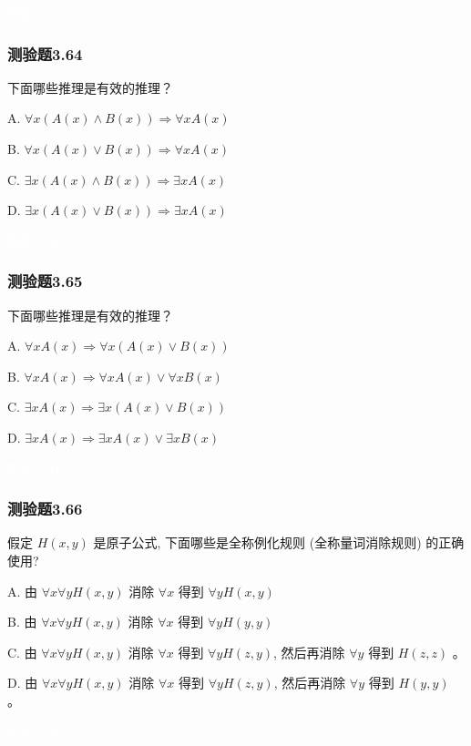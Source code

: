 \documentclass[UTF8, heading=true]{ctexart}
\begin{document}
\textcolor{white}{答案：BC}

\subsubsection{测验题3.64}

下面哪些推理是有效的推理？

A. $\forall x(A(x) \wedge B(x)) \Longrightarrow \forall x A(x)$

B. $\forall x(A(x) \vee B(x)) \Longrightarrow \forall x A(x)$

C. $\exists x(A(x) \wedge B(x)) \Longrightarrow \exists x A(x)$

D. $\exists x(A(x) \vee B(x)) \Longrightarrow \exists x A(x)$

\textcolor{white}{答案：AC}

\subsubsection{测验题3.65}

下面哪些推理是有效的推理？

A. $
\forall x A(x) \Longrightarrow \forall x(A(x) \vee B(x))
$

B. $
\forall x A(x) \Longrightarrow \forall x A(x) \vee \forall x B(x)
$

C. $
\exists x A(x) \Longrightarrow \exists x(A(x) \vee B(x))
$

D. $
\exists x A(x) \Longrightarrow \exists x A(x) \vee \exists x B(x)
$

\textcolor{white}{答案：ABCD}


\subsubsection{测验题3.66}

假定 $H(x, y)$ 是原子公式, 下面哪些是全称例化规则 (全称量词消除规则) 的正确使用?

A. 由 $\forall x \forall y H(x, y)$ 消除 $\forall x$ 得到 $\forall y H(x, y)$

B. 由 $\forall x \forall y H(x, y)$ 消除 $\forall x$ 得到 $\forall y H(y, y)$

C.   由 $\forall x \forall y H(x, y)$ 消除 $\forall x$ 得到 $\forall y H(z, y)$, 然后再消除 $\forall y$ 得到 $H(z, z)$ 。

D.  由 $\forall x \forall y H(x, y)$ 消除 $\forall x$ 得到 $\forall y H(z, y)$, 然后再消除 $\forall y$ 得到 $H(y, y)$ 。


\textcolor{white}{答案：AC}
\end{document}
